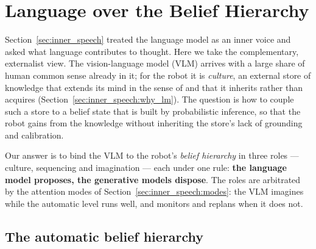 %
%     
%     

\section{Language over the Belief Hierarchy}
\label{sec:lang_hierarchy}

Section~\ref{sec:inner_speech} treated the language model as an inner voice and asked what language contributes to
thought. Here we take the complementary, externalist view. The vision-language model (VLM) arrives with a large share
of human common sense already in it; for the robot it is \emph{culture}, an external store of knowledge that extends
its mind in the sense of \cite{clark1998extended} and that it inherits rather than acquires
(Section~\ref{sec:inner_speech:why_lm}). The question is how to couple such a store to a belief state that is built
by probabilistic inference, so that the robot gains from the knowledge without inheriting the store's lack of
grounding and calibration.

Our answer is to bind the VLM to the robot's \emph{belief hierarchy} in three roles --- culture, sequencing and
imagination --- each under one rule: \textbf{the language model proposes, the generative models dispose}. The roles
are arbitrated by the attention modes of Section~\ref{sec:inner_speech:modes}: the VLM imagines while the automatic
level runs well, and monitors and replans when it does not.

\subsection{The automatic belief hierarchy}
\label{sec:lang_hierarchy:automatic}

